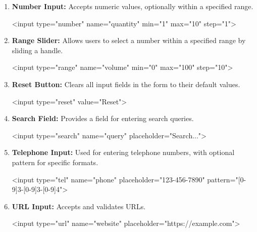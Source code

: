 \documentclass{report}
\begin{document}
\begin{enumerate}
            \item \textbf{Number Input:} Accepts numeric values, optionally within a specified range.
                \bigbreak \noindent 
                \begin{htmlcode}
                    <input type="number" name="quantity" min="1" max="10" step="1">
                \end{htmlcode}
                
            \item \textbf{Range Slider:} Allows users to select a number within a specified range by sliding a handle.
                \bigbreak \noindent 
                \begin{htmlcode}
                    <input type="range" name="volume" min="0" max="100" step="10">
                \end{htmlcode}

            \item \textbf{Reset Button:} Clears all input fields in the form to their default values.
                \bigbreak \noindent 
                \begin{htmlcode}
                    <input type="reset" value="Reset">
                \end{htmlcode}

            \item \textbf{Search Field:} Provides a field for entering search queries.
                \bigbreak \noindent 
                \begin{htmlcode}
                    <input type="search" name="query" placeholder="Search...">
                \end{htmlcode}
                
            \item \textbf{Telephone Input:} Used for entering telephone numbers, with optional pattern for specific formats.
                \bigbreak \noindent 
                \begin{htmlcode}
                    <input type="tel" name="phone" placeholder="123-456-7890" pattern="[0-9]{3}-[0-9]{3}-[0-9]{4}">
                \end{htmlcode}

            \item \textbf{URL Input:} Accepts and validates URLs.
                \bigbreak \noindent 
                \begin{htmlcode}
                    <input type="url" name="website" placeholder="https://example.com">
                \end{htmlcode}
        \end{enumerate}
\end{document}
